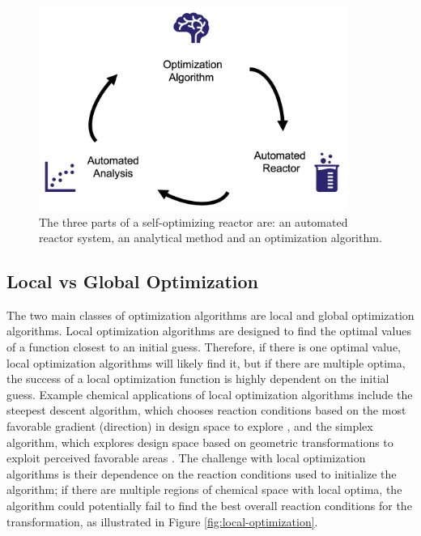 \begin{figure}
    \centering
    \includegraphics[width=0.9\textwidth]{gfx/Chapter02/self-optimization-cycle.png}
    \caption{The three parts of a self-optimizing reactor are: an automated reactor system, an analytical method and an optimization algorithm.}
    \label{fig:optimization-cycle}
\end{figure}

\subsection{Local vs Global Optimization}
The two main classes of optimization algorithms are local and global optimization algorithms. Local optimization algorithms are designed to find the optimal values of a function closest to an initial guess. Therefore, if there is one optimal value, local optimization algorithms will likely find it, but if there are multiple optima, the success of a local optimization function is highly dependent on the initial guess. Example chemical applications of local optimization algorithms include the steepest descent algorithm, which chooses reaction conditions based on the most favorable gradient (direction) in design space to explore \cite{McMullen2010a}, and the simplex algorithm, which explores design space based on geometric transformations to exploit perceived favorable areas \cite{Routh1977, Bourne2011}. The challenge with local optimization algorithms is their dependence on the reaction conditions used to initialize the algorithm; if there are multiple regions of chemical space with local optima, the algorithm could potentially fail to find the best overall reaction conditions for the transformation, as illustrated in Figure \ref{fig:local-optimization}.

